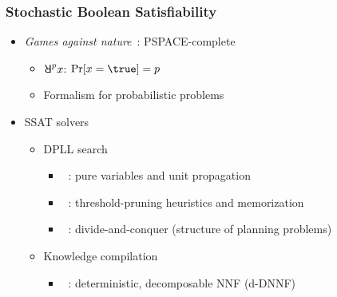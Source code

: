 \begin{frame}
      \frametitle{Stochastic Boolean Satisfiability}
      \begin{itemize}
            \item \textit{Games against nature}~\cite{Papadimitriou1985}: PSPACE-complete~\cite{Stockmeyer1973}
                  \pause
                  \begin{itemize}
                        \item $\random{p}x$: $\spb{x=\true}=p$
                              \pause
                        \item Formalism for probabilistic problems~\cite{SATHandbook-SSAT}
                              \pause
                  \end{itemize}
            \item SSAT solvers
                  \pause
                  \begin{itemize}
                        \item DPLL search~\cite{Davis1962}
                              \pause
                              \begin{itemize}
                                    \item \maxplan~\cite{Majercik1998}: pure variables and unit propagation
                                          \pause
                                    \item \zander~\cite{Majercik2003}: threshold-pruning heuristics and memorization
                                          \pause
                                    \item \dcssat~\cite{Majercik2005}: divide-and-conquer (structure of planning problems)
                                          \pause
                              \end{itemize}
                        \item Knowledge compilation~\cite{Darwiche2002KnowledgeCompilation}
                              \pause
                              \begin{itemize}
                                    \item \complan~\cite{Huang2006}: deterministic, decomposable NNF (d-DNNF)~\cite{Darwiche2001,Darwiche2002dDNNF}
                              \end{itemize}
                  \end{itemize}
      \end{itemize}
\end{frame}